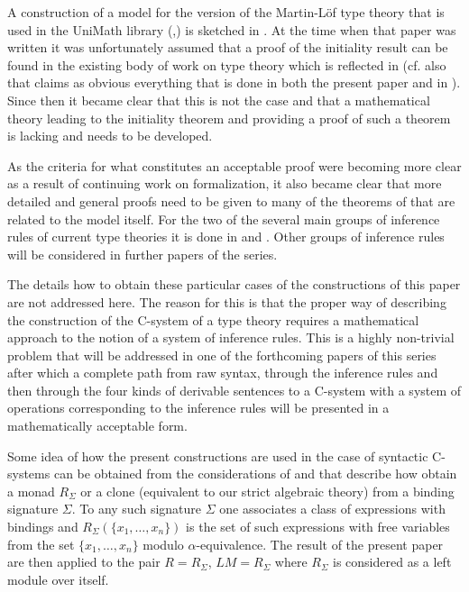 \documentclass[11pt]{article}
\begin{document}
A construction of a model for the version of the Martin-L\"{o}f type theory that is used in the UniMath library (\cite{UniMath},\cite{UniMath2015}) is sketched in \cite{KLV1}. At the time when that paper was written it was unfortunately assumed that a proof of the initiality result can be found in the existing body of work on type theory which is reflected  in \cite[Theorem 1.2.9]{KLV1} (cf. also \cite[Example 1.2.3]{KLV1} that claims as obvious everything that is done in both the present paper and in \cite{Csubsystems}).  Since then it became clear that this is not the case and that a mathematical theory leading to the initiality theorem and providing a proof of such a theorem is lacking and needs to be developed. 

As the criteria for what constitutes an acceptable proof were becoming more clear as a result of continuing work on formalization, it also became clear that more detailed and general proofs need to be given to many of the theorems of \cite{KLV1} that are related to the model itself. For the two of the several main groups of inference rules of current type theories it is done in \cite{fromunivwithPi} and \cite{fromunivwithpaths}. Other groups of inference rules will be considered in further papers of the series. 




The details how to obtain these particular cases of the constructions of this paper are not addressed here. The reason for this is that the proper way of describing the construction of the C-system of a type theory requires a mathematical approach to the notion of a system of inference rules. This is a highly non-trivial problem that will be addressed in one of the forthcoming papers of this series after which a complete path from raw syntax, through the inference rules and then through the four kinds of derivable sentences to a C-system with a system of operations corresponding to the inference rules will be presented in a mathematically acceptable form. 

Some idea of how the present constructions are used in the case of syntactic C-systems can be obtained from the considerations of \cite{HM2007} and \cite{FPT} that describe how obtain a monad $R_{\Sigma}$ or a clone (equivalent to our strict algebraic theory) from a binding signature $\Sigma$. To any such signature $\Sigma$ one associates a class of expressions with bindings and $R_{\Sigma}(\{x_1,\dots,x_n\})$ is the set of such expressions with free variables from the set $\{x_1,\dots,x_n\}$ modulo $\alpha$-equivalence.  The result of the present paper are then applied to the pair $R=R_{\Sigma}$, $LM=R_{\Sigma}$ where $R_{\Sigma}$ is considered as a left module over itself. 
\end{document}
